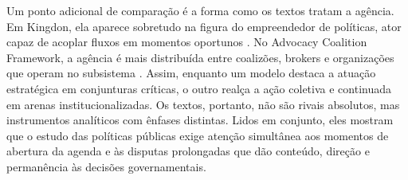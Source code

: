 \documentclass[12pt,a4paper]{article}
\begin{document}
Um ponto adicional de comparação é a forma como os textos tratam a agência. Em Kingdon, ela aparece sobretudo na figura do empreendedor de políticas, ator capaz de acoplar fluxos em momentos oportunos \autocites{kingdon2003agendas}{capella2022multiplos}. No Advocacy Coalition Framework, a agência é mais distribuída entre coalizões, brokers e organizações que operam no subsistema \autocites{araujoSilva2022coalizoes}{sabatier1999theories}. Assim, enquanto um modelo destaca a atuação estratégica em conjunturas críticas, o outro realça a ação coletiva e continuada em arenas institucionalizadas.
Os textos, portanto, não são rivais absolutos, mas instrumentos analíticos com ênfases distintas. Lidos em conjunto, eles mostram que o estudo das políticas públicas exige atenção simultânea aos momentos de abertura da agenda e às disputas prolongadas que dão conteúdo, direção e permanência às decisões governamentais.
\end{document}
